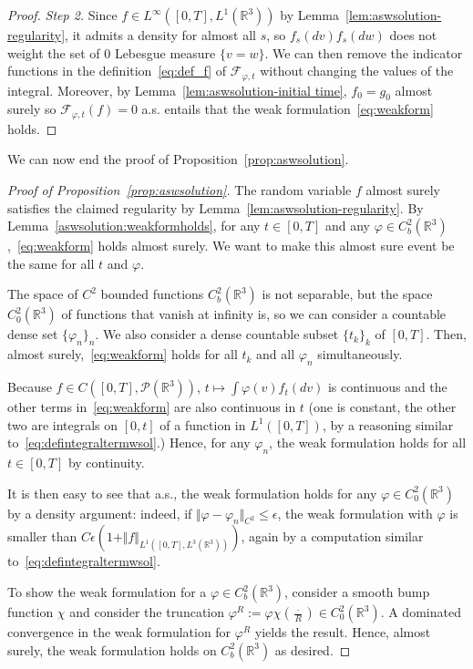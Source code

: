 \documentclass[11pt,a4paper]{article}
\theoremstyle{definition}
\theoremstyle{plain}
\begin{document}
\begin{proof}
    \textit{Step 2.} Since $f\in L^\infty([0,T],L^1(\mathbb{R}^3))$ by Lemma~\ref{lem:aswsolution-regularity}, it admits a density for almost all $s$, so $f_s(dv)f_s(dw)$ does not weight the set of $0$ Lebesgue measure $\{v=w\}$. We can then remove the indicator functions in the definition~\eqref{eq:def_f} of $\mathcal{F}_{\varphi,t}$ without changing the values of the integral. Moreover, by Lemma~\ref{lem:aswsolution-initial time}, $f_0=g_0$ almost surely so $\mathcal{F}_{\varphi,t}(f)=0$ a.s. entails that the weak formulation~\eqref{eq:weakform} holds.
\end{proof}

We can now end the proof of Proposition~\ref{prop:aswsolution}.
\begin{proof}[Proof of Proposition~\ref{prop:aswsolution}]
The random variable $f$ almost surely satisfies the claimed regularity by Lemma~\ref{lem:aswsolution-regularity}.
By Lemma~\ref{aswsolution:weakformholds}, for any $t\in[0,T]$ and any $\varphi\in C^2_b(\mathbb{R}^3)$,~\eqref{eq:weakform} holds almost surely. We want to make this almost sure event be the same for all $t$ and $\varphi$.

The space of $C^2$ bounded functions $C^2_b(\mathbb{R}^3)$ is not separable, but the space $C^2_0(\mathbb{R}^3)$ of functions that vanish at infinity is, so we can consider a countable dense set $\{\varphi_n\}_n$. We also consider a dense countable subset $\{t_k\}_k$ of $[0,T]$. Then, almost surely,~\eqref{eq:weakform} holds for all $t_k$ and all $\varphi_n$ simultaneously.

Because $f\in C([0,T],\mathcal{P}(\mathbb{R}^3))$,  $t\mapsto\int \varphi(v) f_t(dv)$ is continuous and the other terms in~\eqref{eq:weakform} are also continuous in $t$ (one is constant, the other two are integrals on $[0,t]$ of a function in $L^1([0,T])$, by a reasoning similar to~\eqref{eq:defintegraltermwsol}.) Hence, for any $\varphi_n$, the weak formulation holds for all $t\in[0,T]$ by continuity.

It is then easy to see that a.s., the weak formulation holds for any $\varphi\in C^2_0(\mathbb{R}^3)$ by a density argument: indeed, if $\Vert \varphi - \varphi_n\Vert_{C^2}\leq \epsilon$, the weak formulation with $\varphi$ is smaller than $  C\epsilon \left(1 + \Vert f \Vert_{L^1([0,T],L^3(\mathbb{R}^3))} \right) $,
again by a computation similar to~\eqref{eq:defintegraltermwsol}.

To show the weak formulation for a $\varphi\in C^2_b(\mathbb{R}^3)$, consider a smooth bump function $\chi$ and consider the truncation $\varphi^R:= \varphi \chi(\frac{\cdot}{R})\in C^2_0(\mathbb{R}^3)$. A dominated convergence in the weak formulation for $\varphi^R$ yields the result. Hence, almost surely, the weak formulation holds on $C^2_b(\mathbb{R}^3)$ as desired.
\end{proof}
\end{document}
